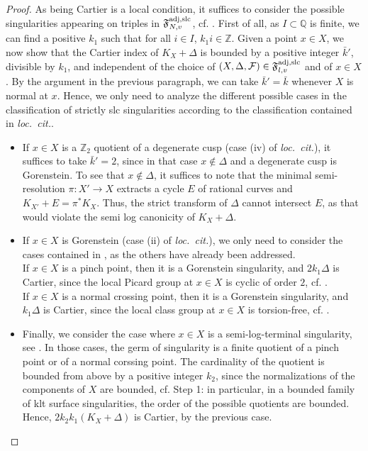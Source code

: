 \documentclass[12pt, a4paper]{amsart}
\newcommand{\setfoliation}[1]{\mathfrak F^{\rm adj, #1}_{N, v}}
\newcommand{\loccit}{{\it loc.~cit.}}
\newcounter{Theorem}
\theoremstyle{definition}
\theoremstyle{named}
\begin{document}
\begin{proof}
		As being Cartier is a local condition, it suffices to consider the possible singularities appearing on triples in 
		$\setfoliation{slc}$, 
		cf. \cite[Theorems 4.24]{KSB88}.
		First of all, as 
		$I \subset \mathbb Q$ 
		is finite, we can find a positive 
		$k_1$ 
		such that for all
		$i \in I$, 
		$k_1i \in \mathbb Z$.
		Given a point 
		$x \in X$, 
		we now show that the Cartier index of 
		$K_X+\Delta$ 
		is bounded by a positive integer 
		$\bar k'$, 
		divisible by 
		$k_1$, 
		and  independent of the choice of
		$(X,\Delta, \mathcal F) \in \mathfrak{F}^{\rm adj, slc}_{l, v}$ and of 
		$x \in X$. 
		By the argument in the previous paragraph, we can take $\bar k'=\bar k$ whenever $X$ is normal at $x$.
		Hence, we only need to analyze the different possible cases in the classification of strictly slc singularities according to the classification contained in \loccit.
		\begin{itemize}
			\item 
		If  $x \in X$ is a 
		$\mathbb Z_2$ 
		quotient of a degenerate cusp (case (iv) of \loccit), 
		it suffices to take 
		$\bar k'=2$, 
		since in that case
		$x \not \in \Delta$
		and a degenerate cusp is Gorenstein.
		To see that $x \not \in \Delta$, it suffices to note that the minimal semi-resolution $\pi \colon X' \to X$ extracts a cycle $E$ of rational curves and $K_{X'}+E=\pi^\ast K_X$.
		Thus, the strict transform of $\Delta$ cannot intersect $E$, as that would violate the semi log canonicity of $K_X+\Delta$.
		
			\item 
		If $x \in X$ is Gorenstein (case (ii) of \loccit), we only need to consider the cases contained in 
		\cite[Theorem 4.21(i))]{KSB88}, as the others have already been addressed.
		\\
		If $x \in X$ is a pinch point, then it is a Gorenstein singularity,  
		and
		$2k_1\Delta$ is Cartier, since the local Picard group at $x \in X$ is cyclic of order $2$, cf. \cite[Example 4.8]{MR3549172}.
		\\
		If $x \in X$ is a normal crossing point, then it is a Gorenstein singularity, and
		$k_1\Delta$ is Cartier, since the local class group at $x \in X$ is torsion-free, cf. \cite[Example 4.6]{MR3549172}.
	
			\item 
		Finally, we consider the case where $x \in X$ is a semi-log-terminal singularity, see \cite[Theorem 4.23(iii)-(v)]{KSB88}.
		In those cases, the germ of singularity is a finite quotient of a pinch point or of a normal corssing point. 
		The cardinality of the quotient is bounded from above by a positive integer $k_2$, since the normalizations of the components of $X$ are bounded, cf. Step 1: in particular, in a bounded family of klt surface singularities, the order of the possible quotients are bounded.
		Hence, $2k_2k_1(K_X+\Delta)$ is Cartier, by the previous case.
		\end{itemize}
		

\end{proof}
\end{document}
